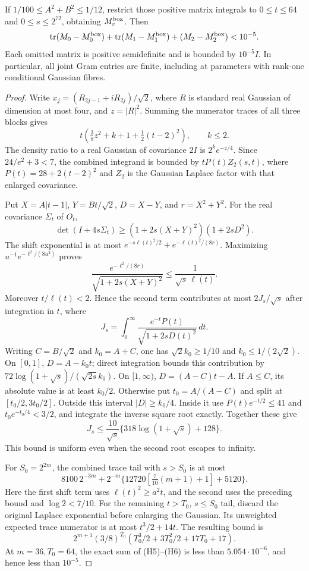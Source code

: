 \begin{theorem}
If $1/100\le A^2+B^2\le1/12$, restrict those positive matrix integrals to
$0\le t\le64$ and $0\le s\le2^{72}$, obtaining $M_r^{\rm box}$. Then
\[
 \operatorname{tr}(M_0-M_0^{\rm box})+
 \operatorname{tr}(M_1-M_1^{\rm box})+(M_2-M_2^{\rm box})<10^{-5}.
\]
Each omitted matrix is positive semidefinite and is bounded by $10^{-5}I$.
In particular, all joint Gram entries are finite, including at parameters
with rank-one conditional Gaussian fibres.
\end{theorem}
\begin{proof}
Write $x_j=(R_{2j-1}+iR_{2j})/\sqrt2$, where $R$ is standard real
Gaussian of dimension at most four, and $z=|R|^2$. Summing the numerator
traces of all three blocks gives
\[
 t\left(\tfrac38z^2+k+1+\tfrac12(t-2)^2\right),\qquad k\le2.
\]
The density ratio to a real Gaussian of covariance $2I$ is
$2^k e^{-z/4}$. Since $24/e^2+3<7$, the combined integrand is bounded by
$tP(t)Z_2(s,t)$, where $P(t)=28+2(t-2)^2$ and $Z_2$ is the Gaussian
Laplace factor with that enlarged covariance.

Put $X=A|t-1|$, $Y=Bt/\sqrt2$, $D=X-Y$, and $r=X^2+Y^2$.
For the real covariance $\Sigma_t$ of $O_t$,
\[
 \det(I+4s\Sigma_t)\ge
 (1+2s(X+Y)^2)(1+2sD^2).
\]
The shift exponential is at most
$e^{-s\ell(t)^2/2}+e^{-\ell(t)^2/(8r)}$.
Maximizing $u^{-1}e^{-\ell^2/(8u^2)}$ proves
\[
 \frac{e^{-\ell^2/(8r)}}{\sqrt{1+2s(X+Y)^2}}
 \le\frac1{\sqrt s\,\ell(t)}.
\]
Moreover $t/\ell(t)<2$. Hence the second term contributes at most
$2J_s/\sqrt s$ after integration in $t$, where
\[
 J_s=\int_0^\infty
       \frac{e^{-t}P(t)}{\sqrt{1+2sD(t)^2}}\,dt.
\]
Writing $C=B/\sqrt2$ and $k_0=A+C$, one has
$\sqrt2k_0\ge1/10$ and $k_0\le1/(2\sqrt2)$.
On $[0,1]$, $D=A-k_0t$; direct integration bounds this contribution by
$72\log(1+\sqrt s)/(\sqrt{2s}k_0)$.
On $[1,\infty)$, $D=(A-C)t-A$. If $A\le C$, its absolute value is at
least $k_0/2$. Otherwise put $t_0=A/(A-C)$ and split at
$[t_0/2,3t_0/2]$. Outside this interval $|D|\ge k_0/4$.
Inside it use $P(t)e^{-t/2}\le41$ and $t_0e^{-t_0/4}<3/2$,
and integrate the inverse square root exactly. Together these give
\[
 J_s\le\frac{10}{\sqrt s}
        \{318\log(1+\sqrt s)+128\}.
\]
This bound is uniform even when the second root escapes to infinity.

For $S_0=2^{2m}$, the combined trace tail with $s>S_0$ is at most
\[
 8100\,2^{-3m}
 +2^{-m}\{12720[\tfrac7{10}(m+1)+1]+5120\}.\tag{H5}
\]
Here the first shift term uses $\ell(t)^2\ge a^2t$, and the second
uses the preceding bound and $\log2<7/10$.
For the remaining $t>T_0$, $s\le S_0$ tail, discard the original
Laplace exponential before enlarging the Gaussian. Its unweighted
expected trace numerator is at most $t^3/2+14t$. The resulting bound is
\[
 2^{m+1}(3/8)^{T_0}
       (T_0^3/2+3T_0^2/2+17T_0+17).\tag{H6}
\]
At $m=36,T_0=64$, the exact sum of (H5)--(H6) is less than
$5.054\cdot10^{-6}$, and hence less than $10^{-5}$.
\end{proof}

